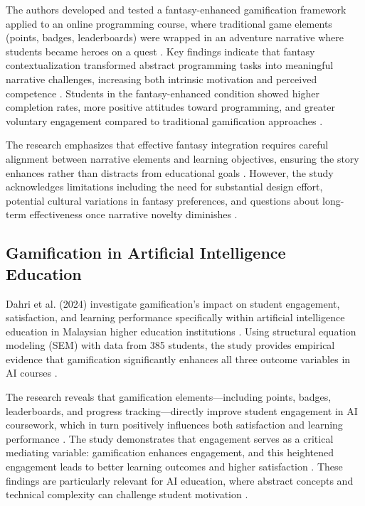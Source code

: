 \documentclass[12pt,a4paper]{article}
\begin{document}
The authors developed and tested a fantasy-enhanced gamification framework applied to an online programming course, where traditional game elements (points, badges, leaderboards) were wrapped in an adventure narrative where students became heroes on a quest \parencite{toda2022}. Key findings indicate that fantasy contextualization transformed abstract programming tasks into meaningful narrative challenges, increasing both intrinsic motivation and perceived competence \parencite{toda2022}. Students in the fantasy-enhanced condition showed higher completion rates, more positive attitudes toward programming, and greater voluntary engagement compared to traditional gamification approaches \parencite{toda2022}.

The research emphasizes that effective fantasy integration requires careful alignment between narrative elements and learning objectives, ensuring the story enhances rather than distracts from educational goals \parencite{toda2022}. However, the study acknowledges limitations including the need for substantial design effort, potential cultural variations in fantasy preferences, and questions about long-term effectiveness once narrative novelty diminishes \parencite{toda2022}.


\subsection{Gamification in Artificial Intelligence Education}

Dahri et al. (2024) investigate gamification's impact on student engagement, satisfaction, and learning performance specifically within artificial intelligence education in Malaysian higher education institutions \parencite{dahri2024}. Using structural equation modeling (SEM) with data from 385 students, the study provides empirical evidence that gamification significantly enhances all three outcome variables in AI courses \parencite{dahri2024}.

The research reveals that gamification elements—including points, badges, leaderboards, and progress tracking—directly improve student engagement in AI coursework, which in turn positively influences both satisfaction and learning performance \parencite{dahri2024}. The study demonstrates that engagement serves as a critical mediating variable: gamification enhances engagement, and this heightened engagement leads to better learning outcomes and higher satisfaction \parencite{dahri2024}. These findings are particularly relevant for AI education, where abstract concepts and technical complexity can challenge student motivation \parencite{dahri2024}.
\end{document}

